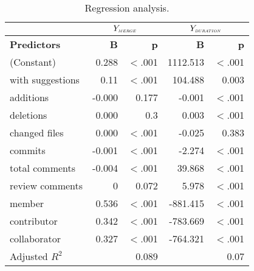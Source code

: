 \begin{table}[t]
    \caption{Regression analysis.}
    \setlength{\tabcolsep}{11pt}
    \begin{tabular}{l rrrr}
    \toprule
        & \multicolumn{2}{c}{$Y_{\scaleto{MERGE}{3pt}}$} & \multicolumn{2}{c}{$Y_{\scaleto{DURATION}{3pt}}$}\\
        \midrule
         \textbf{Predictors}&\textbf{B}&\textbf{p}&\textbf{B}&\textbf{p}\\
         \midrule
       

        (Constant)&0.288&$<$.001&1112.513&$<$.001\\
    with suggestions&0.11&$<$.001&104.488&0.003\\
    additions&-0.000&0.177&-0.001&$<$.001\\
    deletions&0.000&0.3&0.003&$<$.001\\
    changed files&0.000&$<$.001&-0.025&0.383\\
    commits&-0.001&$<$.001&-2.274&$<$.001\\
    total comments&-0.004&$<$.001&39.868&$<$.001\\
    review comments&0&0.072&5.978&$<$.001\\
    member&0.536&$<$.001&-881.415&$<$.001\\
    contributor&0.342&$<$.001&-783.669&$<$.001\\
    collaborator&0.327&$<$.001&-764.321&$<$.001\\




        
        \midrule
        Adjusted $R^2$&&0.089& & 0.07\\
        \bottomrule
    \end{tabular}
    \label{tab:result_stat_merge}
\end{table}
